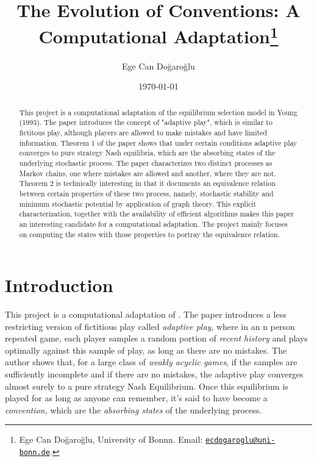 \documentclass[11pt, a4paper, leqno]{article}
\begin{document}
\title{The Evolution of Conventions: A Computational Adaptation\thanks{Ege Can Doğaroğlu, University of Bonnn. Email: \href{mailto:ecdogaroglu@uni-bonn.de}{\nolinkurl{ecdogaroglu@uni-bonn.de}}.}}

\author{Ege Can Doğaroğlu}

\date{
    \today
}

\maketitle


\begin{abstract}
    This project is a computational adaptation of the equilibrium selection model in Young (1993).
    The paper introduces the concept of "adaptive play", which is similar to fictitous play, although
    players are allowed to make mistakes and have limited information. Theorem 1 of the paper shows that
    under certain conditions adaptive play converges to pure strategy Nash equilibria, which are the absorbing
    states of the underlying stochastic process. The paper characterizes two distinct processes as Markov chains, 
    one where mistakes are allowed and another, where they are not. Theorem 2 is technically interesting in that 
    it documents an equivalence relation between certain properties of these two process, namely, stochastic stability
    and minimum stochastic potential by application of graph theory. This explicit characterization, together with 
    the availability of efficient algorithms makes this paper an interesting candidate for a computational adaptation.
    The project mainly focuses on computing the states with those properties to portray the equivalence relation.\end{abstract}

\clearpage


\section{Introduction} %
\label{sec:introduction}


This project is a computational adaptation of .
The paper introduces a less restricting version of fictitious play called \textit{adaptive play},
where in an n person repeated game, each player samples a random portion of \textit{recent history}
and plays optimally against this sample of play, as long as there are no mistakes.
The author shows that, for a large class of \textit{weakly acyclic games}, if the samples are
sufficiently incomplete and if there are no mistakes, the adaptive play converges almost surely
to a pure strategy Nash Equilibrium. Once this equilibrium is played for as long as anyone can
remember, it's said to have become a \textit{convention,} which are the \textit{absorbing states}
of the underlying process.
\end{document}
